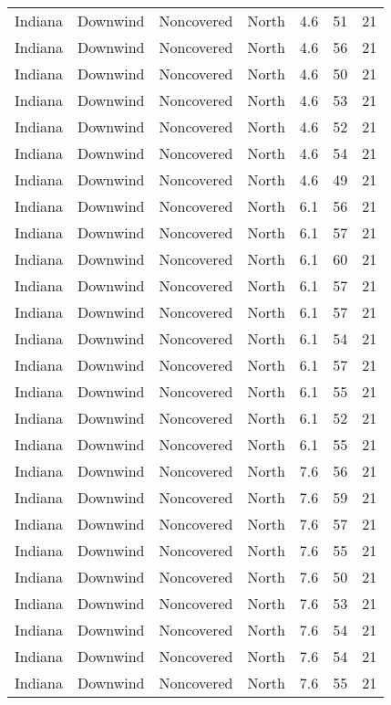 \documentclass{article}
\begin{document}
\begin{longtable}[H]{ccccccc}
Indiana & Downwind & Noncovered & North  & 4.6  & 51 & 21 \\
Indiana & Downwind & Noncovered & North  & 4.6  & 56 & 21 \\
Indiana & Downwind & Noncovered & North  & 4.6  & 50 & 21 \\
Indiana & Downwind & Noncovered & North  & 4.6  & 53 & 21 \\
Indiana & Downwind & Noncovered & North  & 4.6  & 52 & 21 \\
Indiana & Downwind & Noncovered & North  & 4.6  & 54 & 21 \\
Indiana & Downwind & Noncovered & North  & 4.6  & 49 & 21 \\
Indiana & Downwind & Noncovered & North  & 6.1  & 56 & 21 \\
Indiana & Downwind & Noncovered & North  & 6.1  & 57 & 21 \\
Indiana & Downwind & Noncovered & North  & 6.1  & 60 & 21 \\
Indiana & Downwind & Noncovered & North  & 6.1  & 57 & 21 \\
Indiana & Downwind & Noncovered & North  & 6.1  & 57 & 21 \\
Indiana & Downwind & Noncovered & North  & 6.1  & 54 & 21 \\
Indiana & Downwind & Noncovered & North  & 6.1  & 57 & 21 \\
Indiana & Downwind & Noncovered & North  & 6.1  & 55 & 21 \\
Indiana & Downwind & Noncovered & North  & 6.1  & 52 & 21 \\
Indiana & Downwind & Noncovered & North  & 6.1  & 55 & 21 \\
Indiana & Downwind & Noncovered & North  & 7.6  & 56 & 21 \\
Indiana & Downwind & Noncovered & North  & 7.6  & 59 & 21 \\
Indiana & Downwind & Noncovered & North  & 7.6  & 57 & 21 \\
Indiana & Downwind & Noncovered & North  & 7.6  & 55 & 21 \\
Indiana & Downwind & Noncovered & North  & 7.6  & 50 & 21 \\
Indiana & Downwind & Noncovered & North  & 7.6  & 53 & 21 \\
Indiana & Downwind & Noncovered & North  & 7.6  & 54 & 21 \\
Indiana & Downwind & Noncovered & North  & 7.6  & 54 & 21 \\
Indiana & Downwind & Noncovered & North  & 7.6  & 55 & 21 \\

\end{longtable}
\end{document}
